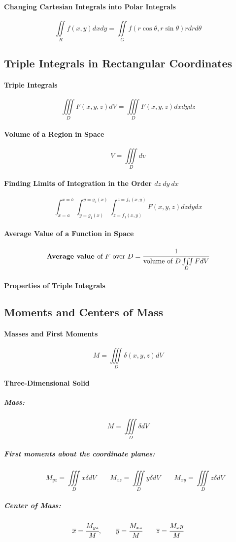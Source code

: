 \documentclass{article}
\begin{document}
            \paragraph{Changing Cartesian Integrals into Polar Integrals}
                \[\iint\limits_Rf(x,y)dxdy=\iint\limits_Gf(r\cos\theta,r\sin\theta)rdrd\theta\]
        \subsection{Triple Integrals in Rectangular Coordinates}
            \paragraph{Triple Integrals}
            \[\iiint\limits_DF(x,y,z)dV=\iiint\limits_DF(x,y,z)dxdydz\]
            \paragraph{Volume of a Region in Space}
                \[V=\iiint\limits_Ddv\]
            \paragraph{Finding Limits of Integration in the Order $dz\ dy\ dx$}
            \[\int_{x=a}^{x=b}\int_{y=g_1(x)}^{y=g_2(x)}\int_{z=f_1(x,y)}^{z=f_2(x,y)}F(x,y,z)dzdydx\]
            \paragraph{Average Value  of a Function in Space}
                \[\textbf{Average value }\text{of }F\text{ over }D=\cfrac{1}{\text{volume of $D$}\iiint\limits_DFdV}\]
            \paragraph{Properties of Triple Integrals}
        \subsection{Moments and Centers of Mass}
            \paragraph{Masses and First Moments}
                \[M=\iiint\limits_D\delta(x,y,z)dV\]
            \paragraph{Three-Dimensional Solid}
                \subparagraph{Mass:}
                \[M=\iiint\limits_D\delta dV\]
                \subparagraph{First moments about the coordinate planes:}
                \[\qquad M_{yz}=\iiint\limits_Dx\delta dV\qquad M_{xz}=\iiint\limits_Dy\delta dV\qquad M_{xy}=\iiint\limits_Dz\delta dV\]
                \subparagraph{Center of Mass:}
                \[\overline{x}=\cfrac{M_{yz}}{M},\qquad \overline{y}=\cfrac{M_{xz}}{M}\qquad \overline{z}=\cfrac{M_xy}{M}\]
\end{document}

